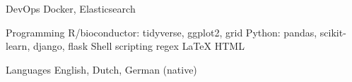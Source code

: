 

\begin{cvskills}

  \cvskill
    {DevOps} %
    {Docker, Elasticsearch} %

  \cvskill
    {Programming} %
    {R/bioconductor: tidyverse, ggplot2, grid}
    {Python: pandas, scikit-learn, django, flask} 
    {Shell scripting}
    {regex}
    {LaTeX} 
    {HTML}%


  \cvskill
    {Languages} %
    {English, Dutch, German (native)} %

\end{cvskills}
